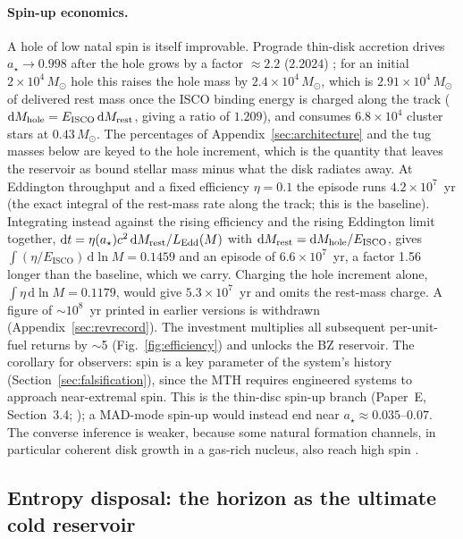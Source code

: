 \documentclass[11pt]{article}
\newcommand{\msun}{\ensuremath{M_\odot}}
\newcommand{\astar}{\ensuremath{a_\star}}
\begin{document}
\paragraph{Spin-up economics.} A hole of low natal spin is itself improvable. Prograde thin-disk accretion drives $\astar \to 0.998$ after the hole grows by a factor $\approx 2.2$ ($2.2024$) \citep{Bardeen1970,Thorne1974}; for an initial $2\times10^{4}\,\msun$ hole this raises the hole mass by $2.4\times10^{4}\,\msun$, which is $2.91\times10^{4}\,\msun$ of delivered rest mass once the ISCO binding energy is charged along the track ($\mathrm{d}M_{\rm hole} = E_{\mathrm{ISCO}}\,\mathrm{d}M_{\rm rest}$, giving a ratio of $1.209$), and consumes $6.8\times10^{4}$ cluster stars at $0.43\,\msun$. The percentages of Appendix~\ref{sec:architecture} and the tug masses below are keyed to the hole increment, which is the quantity that leaves the reservoir as bound stellar mass minus what the disk radiates away. At Eddington throughput and a fixed efficiency $\eta = 0.1$ the episode runs $4.2\times10^{7}$~yr (the exact integral of the rest-mass rate along the track; this is the baseline). Integrating instead against the rising efficiency and the rising Eddington limit together, $\mathrm{d}t = \eta(\astar)c^{2}\,\mathrm{d}M_{\rm rest}/L_{\mathrm{Edd}}(M)$ with $\mathrm{d}M_{\rm rest} = \mathrm{d}M_{\rm hole}/E_{\mathrm{ISCO}}$, gives $\int (\eta/E_{\mathrm{ISCO}})\,\mathrm{d}\ln M = 0.1459$ and an episode of $6.6\times10^{7}$~yr, a factor 1.56 longer than the baseline, which we carry. Charging the hole increment alone, $\int \eta\,\mathrm{d}\ln M = 0.1179$, would give $5.3\times10^{7}$~yr and omits the rest-mass charge. A figure of $\sim$$10^{8}$~yr printed in earlier versions is withdrawn (Appendix~\ref{sec:revrecord}). The investment multiplies all subsequent per-unit-fuel returns by $\sim$5 (Fig.~\ref{fig:efficiency}) and unlocks the BZ reservoir. The corollary for observers: spin is a key parameter of the system's history (Section~\ref{sec:falsification}), since the MTH requires engineered systems to approach near-extremal spin. This is the thin-disc spin-up branch (Paper~E, Section~3.4; \citealt{Swanson2026Engineered}); a MAD-mode spin-up would instead end near $\astar \approx 0.035$--$0.07$. The converse inference is weaker, because some natural formation channels, in particular coherent disk growth in a gas-rich nucleus, also reach high spin \citep[Section~\ref{sec:falsification};][]{BertiVolonteri2008,Reynolds2021}.

\subsection{Entropy disposal: the horizon as the ultimate cold reservoir}
\label{sec:landauer}
\end{document}
